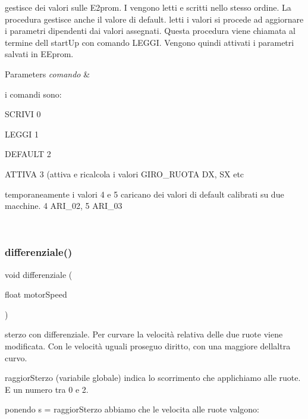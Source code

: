 gestisce dei valori sulle E2prom. I vengono letti e scritti nello stesso ordine. La procedura gestisce anche il valore di default. letti i valori si procede ad aggiornare i parametri dipendenti dai valori assegnati. Questa procedura viene chiamata al termine dell\textquotesingle{} start\+Up con comando L\+E\+G\+GI. Vengono quindi attivati i parametri salvati in E\+Eprom. 


\begin{DoxyParams}{Parameters}
{\em comando} & \begin{DoxyVerb}i comandi sono:

SCRIVI  0

LEGGI   1

DEFAULT 2

ATTIVA  3 (attiva e ricalcola i valori GIRO_RUOTA DX, SX etc

temporaneamente i valori 4 e 5 caricano dei valori di default calibrati su due macchine. 4 ARI_02, 5 ARI_03\end{DoxyVerb}
 \\
\hline
\end{DoxyParams}
\mbox{\label{ari_pi__2_d_c__esp__08_8ino_af117273d2066fa1917036ae9a9742ae7}} 
\subsubsection{\texorpdfstring{differenziale()}{differenziale()}}
{\footnotesize\ttfamily void differenziale (\begin{DoxyParamCaption}\item[{float}]{motor\+Speed }\end{DoxyParamCaption})}



sterzo con differenziale. Per curvare la velocità relativa delle due ruote viene modificata. Con le velocità uguali proseguo diritto, con una maggiore dell\textquotesingle{}altra curvo. 

raggior\+Sterzo (variabile globale) indica lo scorrimento che applichiamo alle ruote. E\textquotesingle{} un numero tra 0 e 2.

ponendo s = raggior\+Sterzo abbiamo che le velocita\textquotesingle{} alle ruote valgono\+:

